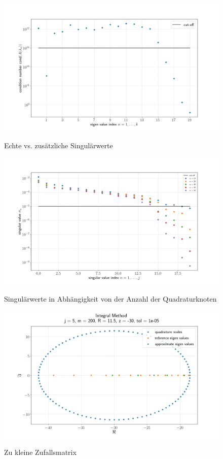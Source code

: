 \begin{figure}
  \caption{Echte vs. zusätzliche Singulärwerte}
  \includegraphics[width=\linewidth]{Plots/conditionnumber.png}
  \label{fig:plot3}
\end{figure}

\begin{figure}
  \caption{Singulärwerte in Abhängigkeit von der Anzahl der Quadraturknoten}
  \includegraphics[width=\linewidth]{Plots/singulaerwerte_quadraturknoten.png}
  \label{fig:plot4}
\end{figure}

\begin{figure}
  \caption{Zu kleine Zufallsmatrix}
  \includegraphics[width=\linewidth]{Plots/zufallsmatrix_zu_klein.png}
  \label{fig:plot5}
\end{figure}

